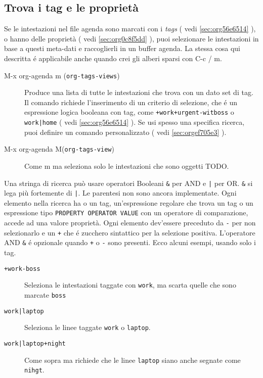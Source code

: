 \documentclass[11pt]{article}
\begin{document}
\subsection{Trova i tag e le proprietà}
\label{sec:orgcab3792}
Se le intestazioni nel file agenda sono marcati con i \emph{tags} ( vedi
\ref{sec:org56e6514} ), o hanno delle proprietà ( vedi \ref{sec:org0c8f5dd} ), puoi selezionare le
intestazioni in base a questi meta-dati e raccoglierli in un buffer
agenda. La stessa cosa qui descritta é applicabile anche quando crei
gli alberi sparsi con C-c / m.

\begin{description}
\item[{M-x org-agenda m (\texttt{org-tags-views})}] Produce una lista di tutte le intestazioni che trova con un dato set
di tag. Il comando richiede l'inserimento di un criterio di
selezione, che é un espressione logica booleana con tag, come
\texttt{+work+urgent-witboss} o \texttt{work|home} ( vedi \ref{sec:org56e6514} ). Se usi spesso
una specifica ricerca, puoi definire un comando personalizzato (
vedi \ref{sec:orgef705e3} ).

\item[{M-x org-agenda M(\texttt{org-tags-view})}] Come m ma seleziona solo le intestazioni che sono oggetti TODO.
\end{description}

Una stringa di ricerca può usare operatori Booleani \texttt{\&} per AND e \texttt{|}
per OR. \texttt{\&} si lega più fortemente di \texttt{|}. Le parentesi non sono
ancora implementate. Ogni elemento nella ricerca ha o un tag,
un'espressione regolare che trova un tag o un espressione tipo
\texttt{PROPERTY OPERATOR VALUE} con un operatore di comparazione, accede ad
una valore proprietà. Ogni elemento dev'essere preceduto da \texttt{-} per
non selezionarlo e un \texttt{+} che é zucchero sintattico per la selezione
positiva. L'operatore AND \texttt{\&} é opzionale quando \texttt{+} o \texttt{-} sono
presenti. Ecco alcuni esempi, usando solo i tag.

\begin{description}
\item[{\texttt{+work-boss}}] Seleziona le intestazioni taggate con \texttt{work}, ma scarta quelle che sono
marcate \texttt{boss}

\item[{\texttt{work|laptop}}] Seleziona le linee taggate \texttt{work} o \texttt{laptop}.

\item[{\texttt{work|laptop+night}}] Come sopra ma richiede che le linee \texttt{laptop} siano anche segnate
come \texttt{nihgt}.
\end{description}
\end{document}
